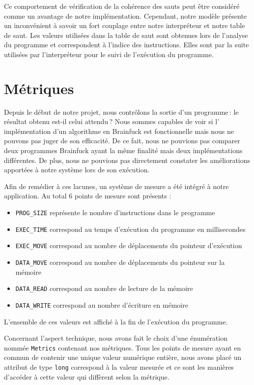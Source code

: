 \documentclass{article}
\begin{document}
    Ce comportement de vérification de la cohérence des sauts peut être considéré comme un avantage de notre implémentation. Cependant, notre modèle présente un inconvénient à savoir un fort couplage entre notre interpréteur et notre table de saut. Les valeurs utilisées dans la table de saut sont obtenues lors de l'analyse du programme et correspondent à l'indice des instructions. Elles sont par la suite utilisées par l'interpréteur pour le suivi de l’exécution du programme.

\section{Métriques}


    Depuis le début de notre projet, nous contrôlons la sortie d'un programme : le résultat obtenu est-il celui attendu ? Nous sommes capables de voir si l' implémentation d'un algorithme en Brainfuck est fonctionnelle mais nous ne pouvons pas juger de son efficacité. De ce fait, nous ne pouvions pas comparer deux programmes Brainfuck ayant la même finalité mais deux implémentations différentes. De plus, nous ne pouvions pas directement constater les améliorations apportées à notre système lors de son exécution.


    Afin de remédier à ces lacunes, un système de mesure a été intégré à notre application. Au total 6 points de mesure sont présents : 


\begin{itemize}
	\item \texttt{PROG\_SIZE} représente le nombre d'instructions dans le programme
	\item \texttt{EXEC\_TIME} correspond au temps d'exécution du programme en millisecondes
	\item \texttt{EXEC\_MOVE} correspond au nombre de déplacements du pointeur d'exécution
	\item \texttt{DATA\_MOVE} correspond au nombre de déplacements du pointeur sur la mémoire
	\item \texttt{DATA\_READ} correspond au nombre de lecture de la mémoire
	\item \texttt{DATA\_WRITE} correspond au nombre d'écriture en mémoire
\end{itemize}

    L'ensemble de ces valeurs est affiché à la fin de l'exécution du programme.



    Concernant l'aspect technique, nous avons fait le choix d'une énumération nommée \texttt{Metrics} contenant nos métriques. Tous les points de mesure ayant en commun de contenir une unique valeur numérique entière, nous avons placé un attribut de type \texttt{long} correspond à la valeur mesurée et ce sont les manières d'accéder à cette valeur qui diffèrent selon la métrique. 
\end{document}
